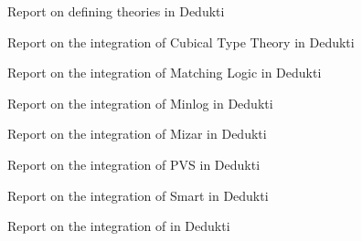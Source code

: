 \begin{workpackage}
\begin{tasklist}
\end{tasklist}

\begin{wpdelivs}
  \begin{wpdeliv}[due=18,id=wp2midterm,dissem=PU,nature=R,lead=Inn]
      {Report on defining theories in Dedukti}
  \end{wpdeliv}
  \begin{wpdeliv}[due=48,id=wp2cubical,dissem=PU,nature=R,lead=Inr,task=hott]
      {Report on the integration of Cubical Type Theory in Dedukti}
  \end{wpdeliv}
  \begin{wpdeliv}[due=36,id=wp2matching,dissem=PU,nature=R,lead=Ias,task=matching]
      {Report on the integration of Matching Logic in Dedukti}
  \end{wpdeliv}
  \begin{wpdeliv}[due=48,id=wp2minlog,dissem=PU,nature=R,lead=Lmu,task=minlog]
      {Report on the integration of Minlog in Dedukti}
  \end{wpdeliv}
  \begin{wpdeliv}[due=48,id=wp2mizar,dissem=PU,nature=R,lead=Bia,task=mizar]
      {Report on the integration of Mizar in Dedukti}
  \end{wpdeliv}
  \begin{wpdeliv}[due=48,id=wp2pvs,dissem=PU,nature=R,lead=Inr,task=pvs]
      {Report on the integration of PVS in Dedukti}
  \end{wpdeliv}
  \begin{wpdeliv}[due=48,id=wp2smart,dissem=PU,nature=R,lead=Pro,task=smart]
      {Report on the integration of Smart in Dedukti}
  \end{wpdeliv}
  \begin{wpdeliv}[due=48,id=wp2tlaplus,dissem=PU,nature=R,lead=Inr,task=tla]
      {Report on the integration of \tlaplus in Dedukti}
  \end{wpdeliv}
\end{wpdelivs}
\end{workpackage}


